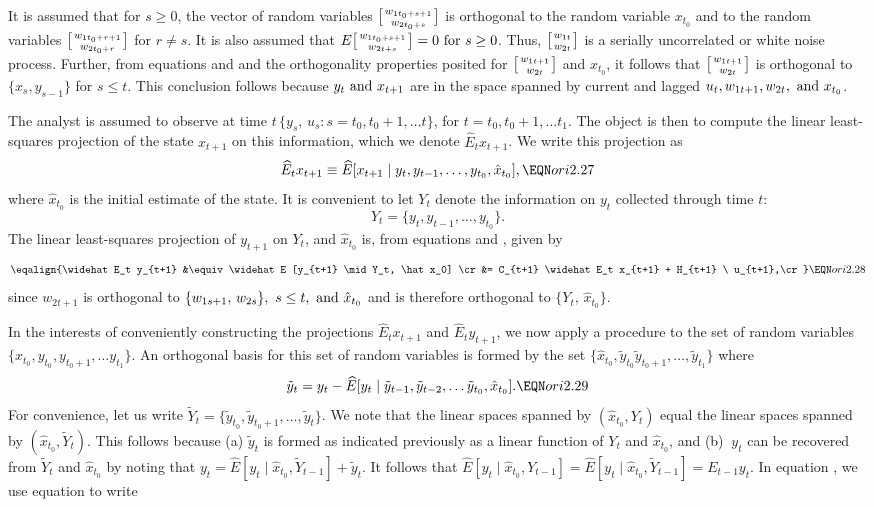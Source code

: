 It is assumed that for $s \geq 0$, the vector of random variables
$\bigl[{w_{1 t_0 + s + 1} \atop w_{2 t_0 + s}}\bigr]$ is orthogonal to the
random variable $x_{t_0}$ and to the random variables $\bigl[{w_{1 t_0 + r +
1} \atop w_{2 t_0 + r}} \bigr]$ for $r \not = s$.  It is also assumed that $E
\bigl[{w_{1 t_0 + s + 1} \atop w_{2 t+s}}\bigr]\hfil\break
 = 0 \hbox { for } s \geq 0$.
Thus, $\bigl[{w_{1t} \atop w_{2t}}\bigr]$ is a serially uncorrelated or
white noise process.  Further, from equations  and  and
the orthogonality
properties posited for $\bigl[{w_{1 t+1} \atop w_{2t}}\bigr]$ and $x_{t_0}$,
it follows that $\bigl[{w_{1 t+1} \atop w_{2t}}\bigr]$ is orthogonal to $\{x_s,
y_{s-1}\}$ for $s \leq t$.  This conclusion follows because $y_t \hbox { and } x_{t+1}$
are in the space spanned by current and lagged $u_t, w_{1t+1},
w_{2t}, \hbox { and } x_{t_0}$.
\par
The analyst is assumed to observe at time $t\, \{ y_s,\, u_s : s = t_0,
t_0 + 1, \ldots t \}$, for $t = t_0, t_0 + 1, \ldots t_1$.  The object is then
to compute the linear least-squares projection of the state $x_{t+1}$ on this
information, which we denote $\widehat E_t x_{t+1}$.  We write this
projection as
$$\widehat E_t x_{t+1} \equiv \widehat E [x_{t+1} \mid y_t, y_{t-1},
\ldots, y_{t_0}, \hat x_{t_0}], \EQN ori2.27$$
where $\hat x_{t_0}$ is the initial estimate of the state.  It is convenient to
let $Y_t$ denote the information on $y_t$ collected through time $t$:
$$Y_t = \{y_t, y_{t-1}, \ldots, y_{t_0}\} .$$
The linear least-squares projection of $y_{t+1}$ on $Y_t$, and $\hat x_{t_0}$
is, from equations  and , given by
$$\eqalign{\widehat E_t y_{t+1} &\equiv \widehat E [y_{t+1} \mid Y_t,
\hat x_0] \cr
&= C_{t+1} \widehat E_t x_{t+1} + H_{t+1} \ u_{t+1},\cr} \EQN ori2.28$$
since $w_{2 t+1}$ is orthogonal to $\{w_{1s+1},\, w_{2s} \},\ s \leq t,\hbox{
and } \hat x_{t_0}$ and is therefore orthogonal to $\{Y_t,\, \hat x_{t_0}\}$.

In the interests of conveniently constructing the projections $\widehat E_t
x_{t+1}$ and $\widehat E_t y_{t+1}$, we now apply a  procedure to the set of random variables $\{\hat x_{t_0},
y_{t_0}, y_{t_0 + 1}, \ldots y_{t_1}\}$.  An orthogonal basis for this
set of random variables is formed by the set $\{\hat x_{t_0}, \tilde y_{t_0}
\tilde y_{t_0 +1}, \ldots, \tilde y_{t_1}\}$ where
$$\tilde y_t = y_t - \widehat E [y_t \mid \tilde y_{t-1}, \tilde y_{t-2},
\ldots \tilde y_{t_0}, \hat x_{t_0}] .\EQN ori2.29$$
For convenience, let us write $\widetilde Y_t =\{\tilde y_{t_0},
\tilde y_{t_0 +1}, \ldots, \tilde y_t\}$.  We note that the
linear spaces spanned by
$(\hat x_{t_0}, Y_t)$ equal the linear spaces spanned by $(\hat x_{t_0},
\tilde Y_t)$.  This follows because (a) $ \tilde y_t$ is formed as
indicated previously as a linear function of $Y_t$ and $\hat x_{t_0}$,
and (b) $ \ y_t$ can be recovered from $\tilde Y_t$ and $\hat x_{t_0}$
by noting that $y_t = \widehat E [y_t \mid \hat x_{t_0}, \tilde Y_{t-1}] +
\tilde y_t$.  It follows that $\widehat E[y_t \mid \hat x_{t_0}, Y_{t-1}] =
\widehat E [y_t \mid \hat x_{t_0}, \tilde Y_{t-1}] = E_{t-1} y_t$.  In equation ,
we use equation  to write


